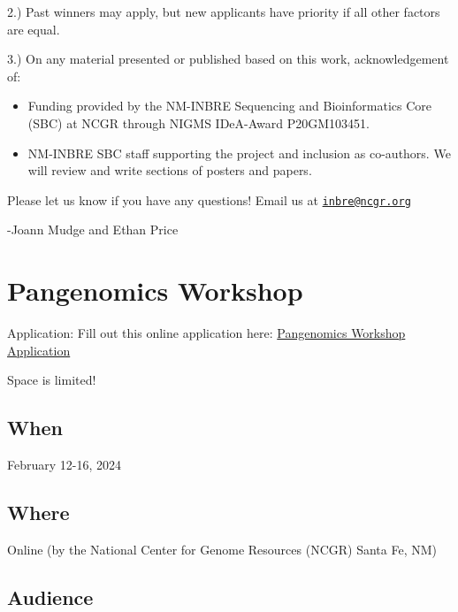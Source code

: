 \documentclass[
]{book}
\begin{document}
2.) Past winners may apply, but new applicants have priority if all other factors are equal.

3.) On any material presented or published based on this work, acknowledgement of:

\begin{itemize}
\item
  Funding provided by the NM-INBRE Sequencing and Bioinformatics Core (SBC) at NCGR through NIGMS IDeA-Award P20GM103451.
\item
  NM-INBRE SBC staff supporting the project and inclusion as co-authors. We will review and write sections of posters and papers.
\end{itemize}

Please let us know if you have any questions! Email us at \href{mailto:inbre@ncgr.org}{\nolinkurl{inbre@ncgr.org}}

-Joann Mudge and Ethan Price

\hypertarget{pangenomics-workshop}{%
\chapter*{Pangenomics Workshop}\label{pangenomics-workshop}}

Application: Fill out this online application here: \href{https://docs.google.com/forms/d/e/1FAIpQLScJPueRpT0M4CHb2RjJI5DGHTXu6mutGBVBoOMCEQsO2JnQ1A/viewform}{Pangenomics Workshop Application}

Space is limited!

\hypertarget{when-1}{%
\section*{When}\label{when-1}}

February 12-16, 2024

\hypertarget{where}{%
\section*{Where}\label{where}}

Online (by the National Center for Genome Resources (NCGR) Santa Fe, NM)

\hypertarget{audience}{%
\section*{Audience}\label{audience}}
\end{document}
